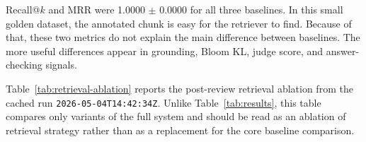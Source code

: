 \documentclass[12pt,a4paper]{article}
\begin{document}
\begin{table}[H]
  \centering
  \singlespacing
  \caption{Core baseline comparison (mean $\pm$ std, 3 repeats, 10 topics).}
  \label{tab:results}

  \small
  \setlength{\tabcolsep}{4pt}
  \renewcommand{\arraystretch}{1.08}

\end{table}

Recall@$k$ and MRR were 1.0000 $\pm$ 0.0000 for all three baselines. In
this small golden dataset, the annotated chunk is easy for the retriever to
find. Because of that, these two metrics do not explain the main difference
between baselines. The more useful differences appear in grounding, Bloom
KL, judge score, and answer-checking signals.

Table~\ref{tab:retrieval-ablation} reports the post-review retrieval
ablation from the cached run \texttt{2026-05-04T14:42:34Z}. Unlike
Table~\ref{tab:results}, this table compares only variants of the full
system and should be read as an ablation of retrieval strategy rather than
as a replacement for the core baseline comparison.

\begin{table}[H]
\centering
\singlespacing
\caption{Post-review retrieval ablation for full-system variants.}
\label{tab:retrieval-ablation}

\end{table}
\end{document}
